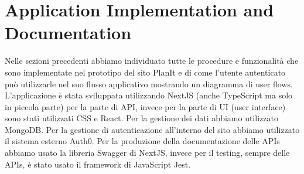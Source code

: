 \section{Application Implementation and Documentation}
\label{secD4:ApplicationImplementationAndDocumentation}
Nelle sezioni precedenti abbiamo individuato tutte le procedure e funzionalità che sono implementate nel prototipo del sito PlanIt e di come l'utente autenticato può utilizzarle nel suo flusso applicativo mostrando un diagramma di user flows. L'applicazione è stata sviluppata utilizzando NextJS (anche TypeScript ma solo in piccola parte) per la parte di API, invece per la parte di UI (user interface) sono stati utilizzati CSS e React. Per la gestione dei dati abbiamo utilizzato MongoDB. Per la gestione di autenticazione all'interno del sito abbiamo utilizzato il sistema esterno Auth0. Per la produzione della documentazione delle APIs abbiamo usato la libreria Swagger di NextJS, invece per il testing, sempre delle APIs, è stato usato il framework di JavaScript Jest.
